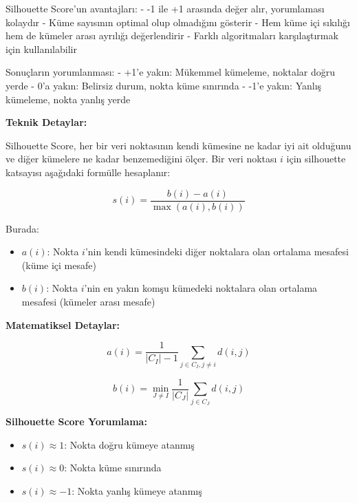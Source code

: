 Silhouette Score'un avantajları:
- -1 ile +1 arasında değer alır, yorumlaması kolaydır
- Küme sayısının optimal olup olmadığını gösterir
- Hem küme içi sıkılığı hem de kümeler arası ayrılığı değerlendirir
- Farklı algoritmaları karşılaştırmak için kullanılabilir

Sonuçların yorumlanması:
- +1'e yakın: Mükemmel kümeleme, noktalar doğru yerde
- 0'a yakın: Belirsiz durum, nokta küme sınırında
- -1'e yakın: Yanlış kümeleme, nokta yanlış yerde

\textbf{Teknik Detaylar:}

Silhouette Score, her bir veri noktasının kendi kümesine ne kadar iyi ait olduğunu ve diğer kümelere ne kadar benzemediğini ölçer. Bir veri noktası $i$ için silhouette katsayısı aşağıdaki formülle hesaplanır:

\begin{equation}
s(i) = \frac{b(i) - a(i)}{\max(a(i), b(i))}
\label{eq:silhouette_score}
\end{equation}

\newpage

Burada:
\begin{itemize}
    \item $a(i)$: Nokta $i$'nin kendi kümesindeki diğer noktalara olan ortalama mesafesi (küme içi mesafe)
    \item $b(i)$: Nokta $i$'nin en yakın komşu kümedeki noktalara olan ortalama mesafesi (kümeler arası mesafe)
\end{itemize}

\textbf{Matematiksel Detaylar:}

\begin{equation}
a(i) = \frac{1}{|C_I| - 1} \sum_{j \in C_I, j \neq i} d(i,j)
\label{eq:intra_cluster_distance}
\end{equation}

\begin{equation}
b(i) = \min_{J \neq I} \frac{1}{|C_J|} \sum_{j \in C_J} d(i,j)
\label{eq:inter_cluster_distance}
\end{equation}

\textbf{Silhouette Score Yorumlama:}
\begin{itemize}
    \item $s(i) \approx 1$: Nokta doğru kümeye atanmış
    \item $s(i) \approx 0$: Nokta küme sınırında 
    \item $s(i) \approx -1$: Nokta yanlış kümeye atanmış
\end{itemize}

